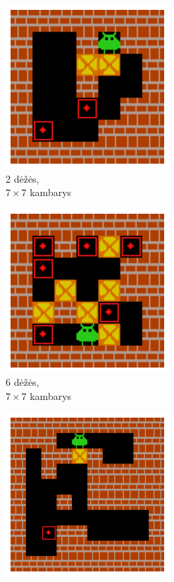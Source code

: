 \documentclass{VUMIFPSbakalaurinis}
\begin{document}
{	\begin{figure}[H]
		\centering
		\begin{subfigure}[b]{.2\textwidth}
			\centering
			\includegraphics[scale=0.4]{img/sokoban/rooms/4}
			\captionsetup{justification=centering}
			\caption{2 dėžės,\\ \(7 \times 7\) kambarys}
			\label{img:room_1}
		\end{subfigure}%
		\begin{subfigure}[b]{.2\textwidth}
			\centering
			\includegraphics[scale=0.4]{img/sokoban/rooms/5}
			\captionsetup{justification=centering}
			\caption{6 dėžės,\\ \(7 \times 7\) kambarys}
			\label{img:room_2}
		\end{subfigure}%
		\begin{subfigure}[b]{.2\textwidth}
			\centering
			\includegraphics[scale=0.4]{img/sokoban/rooms/3}

\end{subfigure}
\end{figure}}
\end{document}
